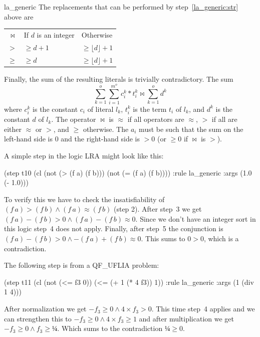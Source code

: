\begin{RuleDescription}{la_generic}
The replacements that can be performed by step~\ref{la_generic:str} above
are

\begin{tabular}{r l l}
$\bowtie$  & If $d$ is an integer  & Otherwise \\
$>$        & $\geq d + 1$  & $\geq \lfloor d\rfloor + 1$  \\
$\geq$     & $\geq d$      & $\geq \lfloor d\rfloor + 1$  \\
\end{tabular}

Finally, the sum of the resulting literals is trivially contradictory.
The sum
\[
    \sum_{k=1}^{o}\sum_{i=1}^{m^o}c_i^k*t_i^k \bowtie \sum_{k=1}^{o}d^k
\]
where $c_i^k$ is the constant $c_i$ of literal $l_k$, $t_i^k$ is the term
$t_i$ of $l_k$, and $d^k$ is the constant $d$ of $l_k$. The operator
$\bowtie$ is $≈$ if all operators are $≈$, $>$ if all are
either $≈$ or $>$, and $\geq$ otherwise. The $a_i$ must be such
that the sum on the left-hand side is $0$ and the right-hand side is $>0$ (or
$\geq 0$ if $\bowtie$ is $>$).
\end{RuleDescription}

\begin{RuleExample}
A simple \currule{} step in the logic \textsf{LRA} might look like this:

\begin{AletheVerb}
(step t10 (cl (not (> (f a) (f b))) (not (= (f a) (f b))))
    :rule la_generic :args (1.0 (- 1.0)))
\end{AletheVerb}

To verify this we have to check the insatisfiability of $(f\,a) > (f\,b) \land
(f\,a) ≈ (f\,b)$ (step 2). After step~3 we get $(f\,a) - (f\,b) > 0 \land
(f\,a) - (f\,b) ≈ 0$. Since we don't have an integer sort in this logic step~4 does
not apply. Finally, after step~5 the conjunction is $(f\,a) - (f\,b) > 0 \land
- (f\,a) + (f\,b) ≈ 0$. This sums to $0 > 0$, which is a contradiction.
\end{RuleExample} 

\begin{RuleExample}
The following \currule{} step is from a \textsf{QF\_UFLIA} problem:
\begin{AletheVerb}
(step t11 (cl (not (<= f3 0)) (<= (+ 1 (* 4 f3)) 1))
    :rule la_generic :args (1 (div 1 4)))
\end{AletheVerb}
After normalization we get $-f_3 \geq 0 \land 4\times f_3 > 0$.
This time step~4 applies and we can strengthen this to
$-f_3 \geq 0 \land 4\times f_3 \geq 1$ and after multiplication we get
$-f_3 \geq 0 \land f_3 \geq ¼$. Which sums to the contradiction
$¼ \geq 0$.
\end{RuleExample}

